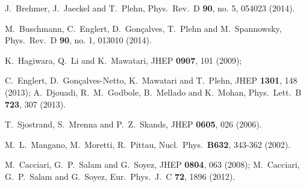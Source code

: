   J.~Brehmer, J.~Jaeckel and T.~Plehn,
  Phys.\ Rev.\ D {\bf 90}, no. 5, 054023 (2014).
  
  M.~Buschmann, C.~Englert, D.~Gon\c{c}alves, T.~Plehn and M.~Spannowsky,
  Phys.\ Rev.\ D {\bf 90}, no. 1, 013010 (2014).

  K.~Hagiwara, Q.~Li and K.~Mawatari,
  JHEP {\bf 0907}, 101 (2009);

  C.~Englert, D.~Gon\c{c}alves-Netto, K.~Mawatari and T.~Plehn,
  JHEP {\bf 1301}, 148 (2013);
  A.~Djouadi, R.~M.~Godbole, B.~Mellado and K.~Mohan,
  Phys.\ Lett.\ B {\bf 723}, 307 (2013).

  T.~Sjostrand, S.~Mrenna and P.~Z.~Skands,
  JHEP {\bf 0605}, 026 (2006).

  M.~L.~Mangano, M.~Moretti, R.~Pittau,
  Nucl.\ Phys.\  {\bf B632}, 343-362 (2002).

  M.~Cacciari, G.~P.~Salam and G.~Soyez,
  JHEP {\bf 0804}, 063 (2008);
  M.~Cacciari, G.~P.~Salam and G.~Soyez,
  Eur.\ Phys.\ J.\ C {\bf 72}, 1896 (2012).

